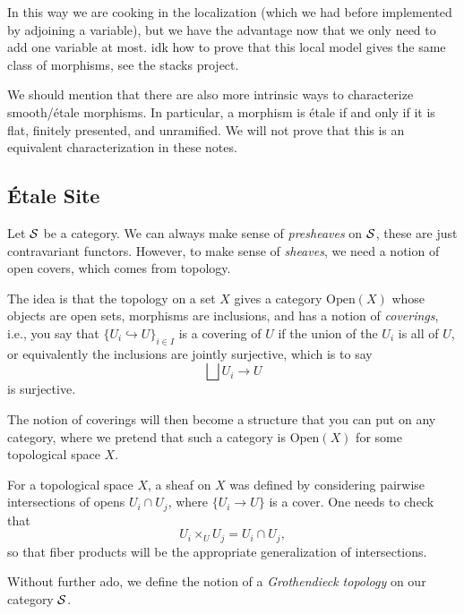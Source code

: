 \documentclass[12pt]{article}
\begin{document}
In this way we are cooking in the localization (which we had before implemented by adjoining a variable), but we have the advantage now that we only need to add one variable at most. {\color{red} idk how to prove that this local model gives the same class of morphisms, see the stacks project}.

\begin{rmk}
    We should mention that there are also more intrinsic ways to characterize smooth/\'etale morphisms. In particular, a morphism is \'etale if and only if it is flat, finitely presented, and unramified. We will not prove that this is an equivalent characterization in these notes.
\end{rmk}

\subsection{\'Etale Site}

Let $\mathcal{S}$ be a category. We can always make sense of \textit{presheaves} on $\mathcal{S}$, these are just contravariant functors. However, to make sense of \textit{sheaves}, we need a notion of open covers, which comes from topology.

The idea is that the topology on a set $X$ gives a category $\mathrm{Open}(X)$ whose objects are open sets, morphisms are inclusions, and has a notion of \textit{coverings}, i.e., you say that $\{U_i\hookrightarrow U\}_{i\in I}$ is a covering of $U$ if the union of the $U_i$ is all of $U$, or equivalently the inclusions are jointly surjective, which is to say
\[\bigsqcup U_i \to U\]
is surjective.

The notion of coverings will then become a structure that you can put on any category, where we pretend that such a category is $\mathrm{Open}(X)$ for some topological space $X$.

\begin{rmk}
    For a topological space $X$, a sheaf on $X$ was defined by considering pairwise intersections of opens $U_i\cap U_j$, where $\{U_i\to U\}$ is a cover. One needs to check that
    \[U_i \times_U U_j = U_i \cap U_j,\]
    so that fiber products will be the appropriate generalization of intersections.
\end{rmk}

Without further ado, we define the notion of a \textit{Grothendieck topology} on our category $\mathcal{S}$.
\end{document}

